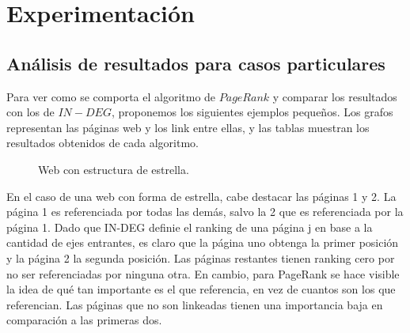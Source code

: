 \section{Experimentación}

\subsection{Análisis de resultados para casos particulares}



Para ver como se comporta el algoritmo de $PageRank$ y comparar los resultados con los de $IN-DEG$, proponemos los siguientes ejemplos pequeños. Los grafos representan las páginas web y los link entre ellas, y las tablas muestran los resultados obtenidos de cada algoritmo.\\

\begin{figure}[H]
\centering     %
{}
\caption{Web con estructura de estrella.}
\end{figure}

En el caso de una web con forma de estrella, cabe destacar las páginas 1 y 2. La página 1 es referenciada por todas las demás, salvo la 2 que es referenciada por la página 1. Dado que IN-DEG definie el ranking de una página j en base a la cantidad de ejes entrantes, es claro que la página uno obtenga la primer posición y la página 2 la segunda posición. Las páginas restantes tienen ranking cero por no ser referenciadas por ninguna otra.
En cambio, para PageRank se hace visible la idea de qué tan importante es el que referencia, en vez de cuantos son los que referencian. Las páginas que no son linkeadas tienen una importancia baja en comparación a las primeras dos.


